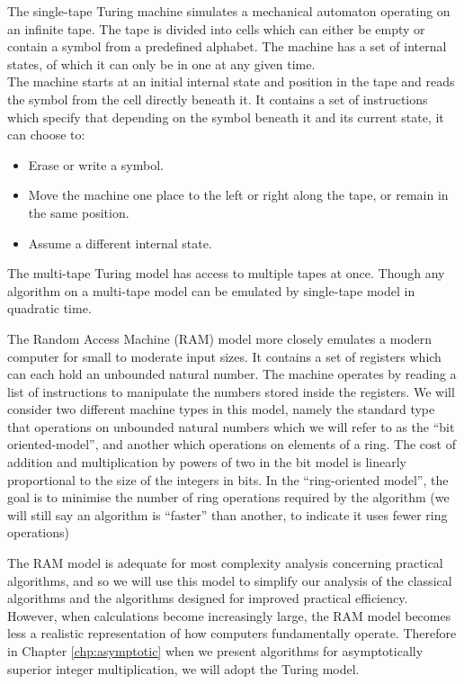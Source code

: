 The single-tape Turing machine simulates a mechanical automaton operating on an infinite tape. The tape is divided into cells which can either be empty or contain a symbol from a predefined alphabet. The machine has a set of internal states, of which it can only be in one at any given time.\\
The machine starts at an initial internal state and position in the tape and reads the symbol from the cell directly beneath it. It contains a set of instructions which specify that depending on the symbol beneath it and its current state, it can choose to:
\begin{itemize}
    \item Erase or write a symbol.
    \item Move the machine one place to the left or right along the tape, or remain in the same position.
    \item Assume a different internal state.
\end{itemize}
The multi-tape Turing model has access to multiple tapes at once. Though any algorithm on a multi-tape model can be emulated by single-tape model in quadratic time\cite{comp-complexity}.

The Random Access Machine (RAM) model more closely emulates a modern computer for small to moderate input sizes. It contains a set of registers which can each hold an unbounded natural number. The machine operates by reading a list of instructions to manipulate the numbers stored inside the registers. We will consider two different machine types in this model, namely the standard type that operations on unbounded natural numbers which we will refer to as the ``bit oriented-model'', and another which operations on elements of a ring. The cost of addition and multiplication by powers of two in the bit model is linearly proportional to the size of the integers in bits. In the ``ring-oriented model'',  the goal is to minimise the number of ring operations required by the algorithm (we will still say an algorithm is ``faster'' than another, to indicate it uses fewer ring operations)

The RAM model is adequate for most complexity analysis concerning practical algorithms, and so we will use this model to simplify our analysis of the classical algorithms and the algorithms designed for improved practical efficiency. However, when calculations become increasingly large, the RAM model becomes less a realistic representation of how computers fundamentally operate. Therefore in Chapter \ref{chp:asymptotic} when we present algorithms for asymptotically superior integer multiplication, we will adopt the Turing model.

